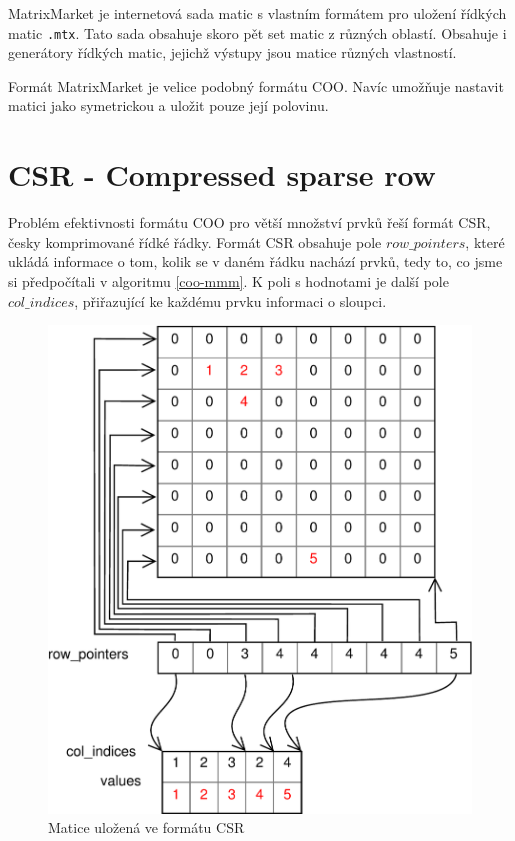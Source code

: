 MatrixMarket \cite{Boisvert:1997:MMW:265834.265854} je internetová sada matic s vlastním formátem pro uložení řídkých matic \texttt{.mtx}. Tato sada obsahuje skoro pět set matic z různých oblastí. Obsahuje i generátory řídkých matic, jejichž výstupy jsou matice různých vlastností.

Formát MatrixMarket je velice podobný formátu COO. Navíc umožňuje nastavit matici jako symetrickou a uložit pouze její polovinu.

\section{CSR - Compressed sparse row}

Problém efektivnosti formátu COO pro větší množství prvků řeší formát CSR, česky komprimované řídké řádky. Formát CSR obsahuje pole $row\_pointers$, které ukládá informace o tom, kolik se v daném řádku nachází prvků, tedy to, co jsme si předpočítali v algoritmu \ref{coo-mmm}. K poli s hodnotami je další pole $col\_indices$, přiřazující ke každému prvku informaci o sloupci.

\begin{figure}[htb]\centering
	\includegraphics[width=\textwidth]{./images/csr/csr}
	\caption{Matice uložená ve formátu CSR}
	\label{fig:CSR}
\end{figure}

